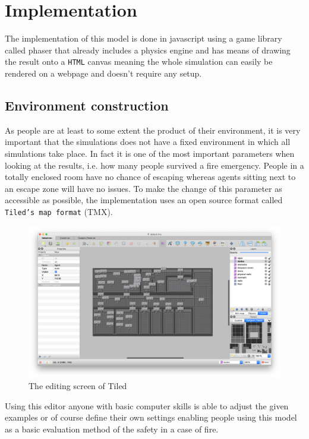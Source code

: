 \documentclass[11pt]{article}
\begin{document}
\section{Implementation}

The implementation of this model is done in javascript using a game library called phaser that already includes a physics engine and has means of drawing the result onto a \texttt{HTML} canvas meaning the whole simulation can easily be rendered on a webpage and doesn't require any setup.

\subsection{Environment construction}
As people are at least to some extent the product of their environment, it is very important that the simulations does not have a fixed environment in which all simulations take place. In fact it is one of the most important parameters when looking at the results, i.e. how many people survived a fire emergency. People in a totally enclosed room have no chance of escaping whereas agents sitting next to an escape zone will have no issues. To make the change of this parameter as accessible as possible, the implementation uses an open source format called \texttt{Tiled's map format} (TMX).

\begin{figure}[H]
	\centering
	\includegraphics[width=1\linewidth]{assets/tiled-editor}\\
	The editing screen of Tiled
\end{figure}

Using this editor anyone with basic computer skills is able to adjust the given examples or of course define their own settings enabling people using this model as a basic evaluation method of the safety in a case of fire.
\end{document}
